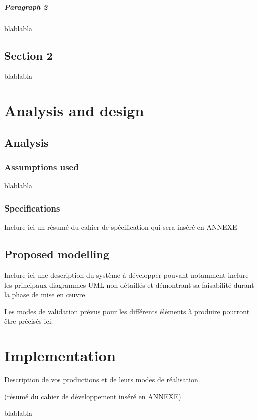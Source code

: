 \documentclass{polytech/polytech}
\numberwithin{figure}{chapter}
\begin{document}
\paragraph{Paragraph 2}

blablabla

\section{Section 2}

blablabla


\chapter{Analysis and design}

\section{Analysis}

\subsection{Assumptions used}
blablabla

\subsection{Specifications}
Inclure ici un résumé du cahier de spécification qui sera inséré en ANNEXE

\section{Proposed modelling}

Inclure ici une description du système à développer
pouvant notamment inclure les principaux diagrammes UML non détaillés
et démontrant sa faisabilité durant la phase de mise en œuvre.

Les modes de validation prévus pour les différents éléments à produire
pourront être précisés ici.

\chapter{Implementation}

Description de vos productions et de leurs modes de réalisation.

(résumé du cahier de développement inséré en ANNEXE)

blablabla
\end{document}
